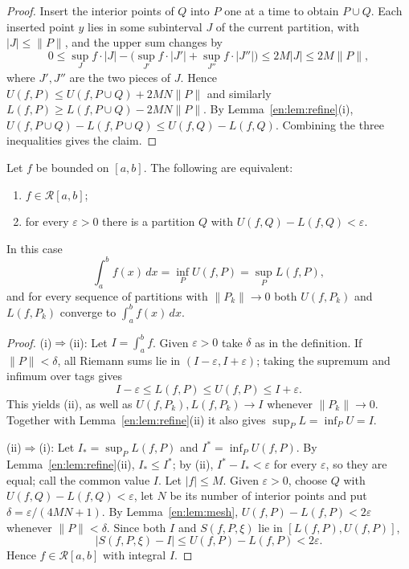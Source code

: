\documentclass[11pt]{article}
\makeatletter
\newcommand{\envlabel}[1]{\protected@edef\@currentlabel{\themathenv}\label{#1}}
\makeatother
\begin{document}
\begin{proof}
Insert the interior points of $Q$ into $P$ one at a time to obtain $P\cup Q$. Each inserted point $y$ lies in some subinterval $J$ of the current partition, with $|J|\leq\|P\|$, and the upper sum changes by
\[
0\leq \sup_{J}f\cdot|J|-\big(\sup_{J'}f\cdot|J'|+\sup_{J''}f\cdot|J''|\big)\leq 2M|J|\leq 2M\|P\|,
\]
where $J',J''$ are the two pieces of $J$. Hence $U(f,P)\leq U(f,P\cup Q)+2MN\|P\|$ and similarly $L(f,P)\geq L(f,P\cup Q)-2MN\|P\|$. By Lemma~\ref{en:lem:refine}(i), $U(f,P\cup Q)-L(f,P\cup Q)\leq U(f,Q)-L(f,Q)$. Combining the three inequalities gives the claim.
\end{proof}

\begin{theorem}\envlabel{en:thm:darboux}
Let $f$ be bounded on $[a,b]$. The following are equivalent:
\begin{enumerate}
  \item $f\in\mathcal{R}[a,b]$;
  \item for every $\varepsilon>0$ there is a partition $Q$ with $U(f,Q)-L(f,Q)<\varepsilon$.
\end{enumerate}
In this case
\[
\int_{a}^{b}f(x)\,dx=\inf_{P}U(f,P)=\sup_{P}L(f,P),
\]
and for every sequence of partitions with $\|P_{k}\|\to0$ both $U(f,P_{k})$ and $L(f,P_{k})$ converge to $\int_{a}^{b}f(x)\,dx$.
\end{theorem}

\begin{proof}
(i)$\Rightarrow$(ii): Let $I=\int_{a}^{b}f$. Given $\varepsilon>0$ take $\delta$ as in the definition. If $\|P\|<\delta$, all Riemann sums lie in $(I-\varepsilon,I+\varepsilon)$; taking the supremum and infimum over tags gives
\[
I-\varepsilon\leq L(f,P)\leq U(f,P)\leq I+\varepsilon.
\]
This yields (ii), as well as $U(f,P_{k}),L(f,P_{k})\to I$ whenever $\|P_{k}\|\to0$. Together with Lemma~\ref{en:lem:refine}(ii) it also gives $\sup_{P}L=\inf_{P}U=I$.

(ii)$\Rightarrow$(i): Let $I_{*}=\sup_{P}L(f,P)$ and $I^{*}=\inf_{P}U(f,P)$. By Lemma~\ref{en:lem:refine}(ii), $I_{*}\leq I^{*}$; by (ii), $I^{*}-I_{*}<\varepsilon$ for every $\varepsilon$, so they are equal; call the common value $I$. Let $|f|\leq M$. Given $\varepsilon>0$, choose $Q$ with $U(f,Q)-L(f,Q)<\varepsilon$, let $N$ be its number of interior points and put $\delta=\varepsilon/(4MN+1)$. By Lemma~\ref{en:lem:mesh}, $U(f,P)-L(f,P)<2\varepsilon$ whenever $\|P\|<\delta$. Since both $I$ and $S(f,P,\xi)$ lie in $[L(f,P),U(f,P)]$,
\[
|S(f,P,\xi)-I|\leq U(f,P)-L(f,P)<2\varepsilon.
\]
Hence $f\in\mathcal{R}[a,b]$ with integral $I$.
\end{proof}
\end{document}
